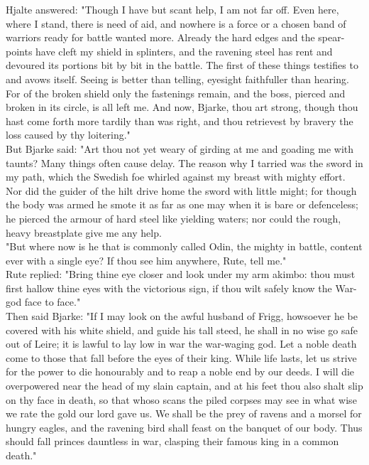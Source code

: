 \documentclass[10pt,a4paper]{report}
\begin{document}
Hjalte answered: "Though I have but scant help, I am not far off. Even here, where I stand, there is need of aid, and nowhere is a force or a chosen band of warriors ready for battle wanted more. Already the hard edges and the spear-points have cleft my shield in splinters, and the ravening steel has rent and devoured its portions bit by bit in the battle. The first of these things testifies to and avows itself. Seeing is better than telling, eyesight faithfuller than hearing. For of the broken shield only the fastenings remain, and the boss, pierced and broken in its circle, is all left me. And now, Bjarke, thou art strong, though thou hast come forth more tardily than was right, and thou retrievest by bravery the loss caused by thy loitering."\\

But Bjarke said: "Art thou not yet weary of girding at me and goading me with taunts? Many things often cause delay. The reason why I tarried was the sword in my path, which the Swedish foe whirled against my breast with mighty effort. Nor did the guider of the hilt drive home the sword with little might; for though the body was armed he smote it as far as one may when it is bare or defenceless; he pierced the armour of hard steel like yielding waters; nor could the rough, heavy breastplate give me any help.\\

"But where now is he that is commonly called Odin, the mighty in battle, content ever with a single eye? If thou see him anywhere, Rute, tell me."\\

Rute replied: "Bring thine eye closer and look under my arm akimbo: thou must first hallow thine eyes with the victorious sign, if thou wilt safely know the War-god face to face."\\

Then said Bjarke: "If I may look on the awful husband of Frigg, howsoever he be covered with his white shield, and guide his tall steed, he shall in no wise go safe out of Leire; it is lawful to lay low in war the war-waging god. Let a noble death come to those that fall before the eyes of their king. While life lasts, let us strive for the power to die honourably and to reap a noble end by our deeds. I will die overpowered near the head of my slain captain, and at his feet thou also shalt slip on thy face in death, so that whoso scans the piled corpses may see in what wise we rate the gold our lord gave us. We shall be the prey of ravens and a morsel for hungry eagles, and the ravening bird shall feast on the banquet of our body. Thus should fall princes dauntless in war, clasping their famous king in a common death."\\
\end{document}
